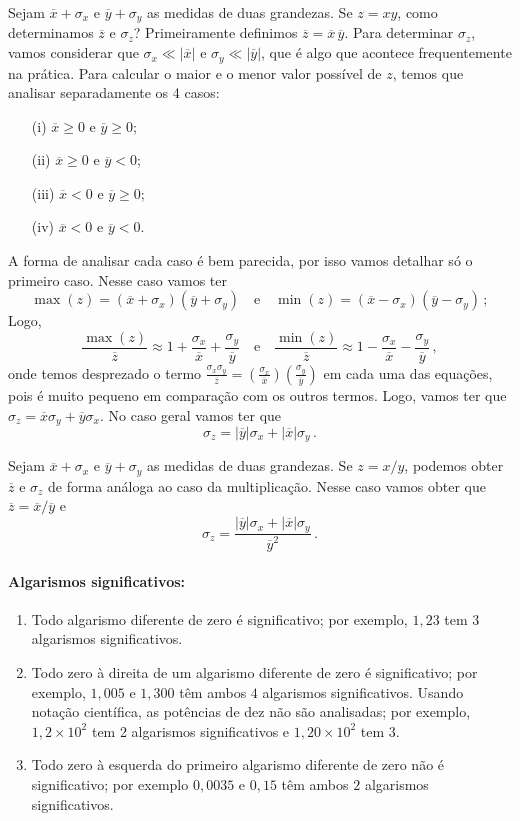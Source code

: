 \documentclass[12pt, a4paper]{article}
\begin{document}
Sejam $\overline{x}+\sigma_x$ e $\overline{y}+\sigma_y$ as medidas de duas grandezas. Se $z=xy$, como determinamos $\overline{z}$ e $\sigma_z$? Primeiramente definimos $\overline{z}=\overline{x}\,\overline{y}$. Para determinar $\sigma_z$, vamos considerar que $\sigma_x\ll |\overline{x}|$ e $\sigma_y\ll |\overline{y}|$, que é algo que acontece frequentemente na prática. Para calcular o maior e o menor valor possível de $z$, temos que analisar separadamente os 4 casos: 
\begin{enumerate}
	\item[(i)] $\overline{x}\ge 0$ e $\overline{y}\ge 0$;
	\item[(ii)] $\overline{x}\ge 0$ e $\overline{y}<0$;
	\item[(iii)] $\overline{x}<0$ e $\overline{y}\ge 0$;
	\item[(iv)] $\overline{x}<0$ e $\overline{y}<0$.
\end{enumerate}
A forma de analisar cada caso é bem parecida, por isso vamos detalhar só o primeiro caso. Nesse caso vamos ter $$\max(z)=(\overline{x}+\sigma_x)(\overline{y}+\sigma_y)\quad\text{e}\quad\min(z)=(\overline{x}-\sigma_x)(\overline{y}-\sigma_y)\,;$$
Logo, 
$$\frac{\max(z)}{\overline{z}}\approx 1+\frac{\sigma_x}{\overline{x}}+\frac{\sigma_y}{\overline{y}}\quad\text{e}\quad\frac{\min(z)}{\overline{z}}\approx 1-\frac{\sigma_x}{\overline{x}}-\frac{\sigma_y}{\overline{y}}\,,$$
onde temos desprezado o termo $\frac{\sigma_x\sigma_y}{\overline{z}}=(\frac{\sigma_x}{\overline{x}})(\frac{\sigma_y}{\overline{y}})$ em cada uma das equações, pois é muito pequeno em comparação com os outros termos. Logo, vamos ter que $\sigma_z=\overline{x}\sigma_y+\overline{y}\sigma_x$. No caso geral vamos ter que
$$\sigma_z=|\overline{y}|\sigma_x+|\overline{x}|\sigma_y\,.$$

Sejam $\overline{x}+\sigma_x$ e $\overline{y}+\sigma_y$ as medidas de duas grandezas. Se $z=x/y$, podemos obter $\overline{z}$ e $\sigma_z$ de forma análoga ao caso da multiplicação. Nesse caso vamos obter que $\overline{z}=\overline{x}/\overline{y}$ e
$$\sigma_z=\frac{|\overline{y}|\sigma_x+|\overline{x}|\sigma_y}{\overline{y}^2}\,.$$

\paragraph{Algarismos significativos:}
\begin{enumerate}
	\item Todo algarismo diferente de zero é significativo; por exemplo, $1,23$ tem $3$ algarismos significativos.
	\item Todo zero à direita de um algarismo diferente de zero é significativo; por exemplo, $1,005$ e $1,300$ têm ambos $4$ algarismos significativos. Usando notação científica, as potências de dez não são analisadas; por exemplo, $1,2\times 10^2$ tem 2 algarismos significativos e $1,20\times10^2$ tem $3$.
	\item Todo zero à esquerda do primeiro algarismo diferente de zero não é significativo; por exemplo $0,0035$ e $0,15$ têm ambos $2$ algarismos significativos.
\end{enumerate}
\end{document}
